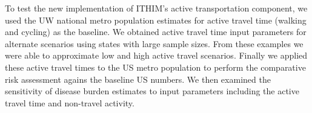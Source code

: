 To test the new implementation of ITHIM's active transportation component, we used the UW national metro population estimates for active travel time (walking and cycling) as the baseline. We obtained active travel time input parameters for alternate scenarios using states with large sample sizes. From these examples we were able to approximate low and high active travel scenarios. Finally we applied these active travel times to the US metro population to perform the comparative risk assessment agains the baseline US numbers. We then examined the sensitivity of disease burden estimates to input parameters including the active travel time and non-travel activity. 
